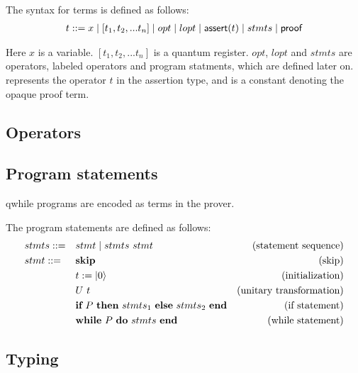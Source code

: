 \begin{definition}
    \label{def:term syntax}
    The syntax for terms is defined as follows:
    \begin{align*}
        t ::= x \mid [t_1, t_2, ... t_n] \mid opt \mid lopt \mid \textsf{assert}(t) \mid stmts \mid \textsf{proof}
    \end{align*}
\end{definition}
Here $x$ is a variable. $[t_1, t_2, ... t_n]$ is a quantum register. $opt$, $lopt$ and $stmts$ are operators, labeled operators and program statments, which are defined later on.  represents the operator $t$ in the assertion type, and \pf is a constant denoting the opaque proof term.

\subsection{Operators}

\subsection{Program statements}
qwhile programs are encoded as terms in the prover.

\newcommand{\Skip}{\textbf{skip}}
\newcommand{\Init}[1]{\ensuremath{#1:=\ket{0}}}
\newcommand{\If}[3]{\ensuremath{
    \textbf{if}\ #1\ \textbf{then}\ #2\ \textbf{else}\ #3\ \textbf{end}
}}
\newcommand{\While}[2]{\ensuremath{
    \textbf{while}\ #1\ \textbf{do}\ #2\ \textbf{end}
}}

\begin{definition}
    \label{def: prog syntax}
    The program statements are defined as follows:
    \begin{align*}
        & stmts ::= && stmt \mid stmts\ stmt & \text{(statement sequence)} \\
        & stmt ::= && \Skip & \text{(skip)} \\
            & && \Init{t} & \text{(initialization)} \\
            & && U\ t & \text{(unitary transformation)} \\
            & && \If{P}{stmts_1}{stmts_2} & \text{(if statement)} \\
            & && \While{P}{stmts} & \text{(while statement)}
    \end{align*}
\end{definition}


\subsection{Typing}

